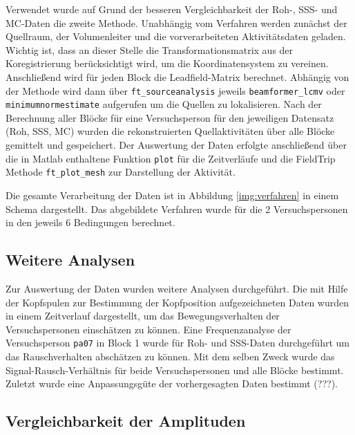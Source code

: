 \documentclass[doc,a4paper,12pt]{apa6}
\begin{document}
Verwendet wurde auf Grund der besseren Vergleichbarkeit der Roh-, SSS- und MC-Daten die zweite Methode. Unabhängig vom Verfahren werden zunächst der Quellraum, der Volumenleiter und die vorverarbeiteten Aktivitätsdaten geladen. Wichtig ist, dass an dieser Stelle die Transformationsmatrix aus der Koregistrierung berücksichtigt wird, um die Koordinatensystem zu vereinen. Anschließend wird für jeden Block die Leadfield-Matrix berechnet. Abhängig von der Methode wird dann über \texttt{ft\_sourceanalysis} jeweils \texttt{beamformer\_lcmv} oder \texttt{minimumnormestimate} aufgerufen um die Quellen zu lokalisieren. Nach der Berechnung aller Blöcke für eine Versuchsperson für den jeweiligen Datensatz (Roh, SSS, MC) wurden die rekonstruierten Quellaktivitäten über alle Blöcke gemittelt und gespeichert. Der Auswertung der Daten erfolgte anschließend über die in Matlab enthaltene Funktion \texttt{plot} für die Zeitverläufe und die FieldTrip Methode \texttt{ft\_plot\_mesh} zur Darstellung der Aktivität.

Die gesamte Verarbeitung der Daten ist in Abbildung \ref{img:verfahren} in einem Schema dargestellt. Das abgebildete Verfahren wurde für die 2 Versuchspersonen in den jeweils 6 Bedingungen berechnet.

\subsection{Weitere Analysen}

Zur Auswertung der Daten wurden weitere Analysen durchgeführt. Die mit Hilfe der Kopfspulen zur Bestimmung der Kopfposition aufgezeichneten Daten wurden in einem Zeitverlauf dargestellt, um das Bewegungsverhalten der Versuchspersonen einschätzen zu können. Eine Frequenzanalyse der Versuchsperson \texttt{pa07} in Block 1 wurde für Roh- und SSS-Daten durchgeführt um das Rauschverhalten abschätzen zu können. Mit dem selben Zweck wurde das Signal-Rausch-Verhältnis für beide Versuchspersonen und alle Blöcke bestimmt. Zuletzt wurde eine Anpassungsgüte der vorhergesagten Daten bestimmt (???).


\subsection{Vergleichbarkeit der Amplituden}
\label{sec:amplitud}


\end{document}
